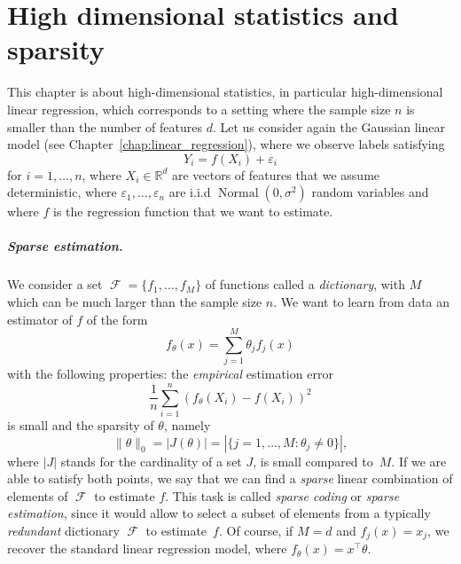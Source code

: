 \documentclass[
	fontsize=11pt, %
	twoside=false, %
	numbers=noenddot, %
]{kaobook}
\DeclareMathOperator{\cF}{{\mathcal F}}
\DeclareMathOperator{\nor}{Normal}
\newcommand{\eps}{\varepsilon}
\newcommand{\R}{\mathbb R}
\newcommand{\norm}[1]{\| #1 \|}
\begin{document}
\mainmatter %


% 

% 

% 

% 

% 

\setchapterpreamble[u]{\margintoc}
\chapter{High dimensional statistics and sparsity}
\label{chap:high_dimensional_statistics}

This chapter is about high-dimensional statistics, in particular high-dimensional linear regression, which corresponds to a setting where the sample size $n$ is smaller than the number of features $d$.
Let us consider again the Gaussian linear model (see Chapter~\ref{chap:linear_regression}), where we observe labels satisfying
\begin{equation*}
	Y_i = f(X_i) + \eps_i
\end{equation*}
for $i=1, \ldots, n$, where $X_i \in \R^d$ are vectors of features that we assume deterministic, where $\eps_1, \ldots, \eps_n$ are i.i.d $\nor(0, \sigma^2)$ random variables and where $f$ is the regression function that we want to estimate.


\paragraph{Sparse estimation.}

We consider a set $\cF = \{ f_1, \ldots, f_M \}$ of functions called a \emph{dictionary}, with $M$ which can be much larger than the sample size $n$.  
We want to learn from data an estimator of $f$ of the form
\begin{equation*}
	f_\theta(x) = \sum_{j=1}^M \theta_j f_j(x)
\end{equation*}
with the following properties: the \emph{empirical} estimation error
\begin{equation*}
	\frac 1n \sum_{i=1}^n (f_\theta(X_i) - f(X_i))^2
\end{equation*}
is small and the sparsity of $\theta$, namely
\begin{equation}
	\label{eq:sparsity}
	\norm{\theta}_0 = |J(\theta)| = | \{ j=1, \ldots, M : \theta_j \neq 0\} |,
\end{equation}
where $|J|$ stands for the cardinality of a set $J$, is small compared to~$M$.
If we are able to satisfy both points, we say that we can find a \emph{sparse} linear combination of elements of $\cF$ to estimate $f$.
This task is called \emph{sparse coding} or \emph{sparse estimation}, since it would allow to select a subset of elements from a typically \emph{redundant} dictionary $\cF$ to estimate~$f$.
Of course, if $M = d$ and $f_j(x) = x_j$, we recover the standard linear regression model, where $f_\theta(x) = x^\top \theta$.
\end{document}
